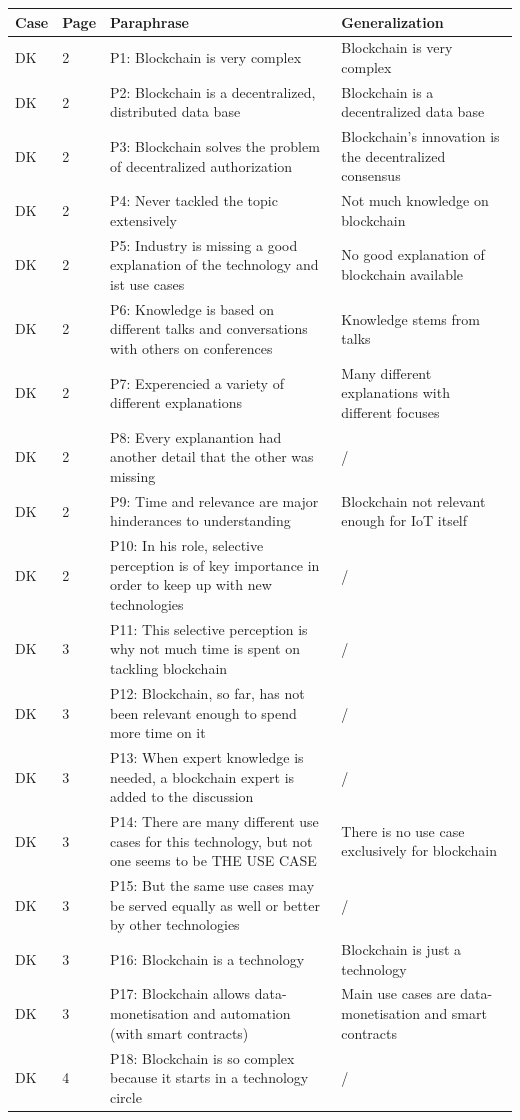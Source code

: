 \label{Anhangteil:DK}
\begin{table}[H]
    \centering
    \begin{tabularx}{\textwidth}{ll|X|p{4cm}}
     Case & Page & Paraphrase & Generalization  \\ \hline
    DK & 2 & P1: Blockchain is very complex & Blockchain is very complex  \\
	DK & 2 & P2: Blockchain is a decentralized, distributed data base & Blockchain is a decentralized data base \\
	DK & 2 & P3: Blockchain solves the problem of decentralized authorization & Blockchain's innovation is the decentralized consensus  \\
	DK & 2 & P4: Never tackled the topic extensively & Not much knowledge on blockchain  \\ 
	DK & 2 & P5: Industry is missing a good explanation of the technology and ist use cases & No good explanation of blockchain available  \\
	DK & 2 & P6: Knowledge is based on different talks and conversations with others on conferences & Knowledge stems from talks  \\
	DK & 2 & P7: Experencied a variety of different explanations & Many different explanations with different focuses   \\
	DK & 2 & P8: Every explanantion had another detail that the other was missing & /  \\
	DK & 2 & P9: Time and relevance are major hinderances to understanding & Blockchain not relevant enough for IoT itself  \\
	DK & 2 & P10: In his role, selective perception is of key importance in order to keep up with new technologies & /  \\
	DK & 3 & P11: This selective perception is why not much time is spent on tackling blockchain & /  \\
	DK & 3 & P12: Blockchain, so far, has not been relevant enough to spend more time on it & /  \\
	DK & 3 & P13: When expert knowledge is needed, a blockchain expert is added to the discussion & /  \\
	DK & 3 & P14: There are many different use cases for this technology, but not one seems to be THE USE CASE & There is no use case exclusively for blockchain  \\
	DK & 3 & P15: But the same use cases may be served equally as well or better by other technologies & /   \\
	DK & 3 & P16: Blockchain is a technology & Blockchain is just a technology \\
	DK & 3 & P17: Blockchain allows data-monetisation and automation (with smart contracts) & Main use cases are data-monetisation and smart contracts \\
	DK & 4 & P18: Blockchain is so complex because it starts in a technology circle & / \\

    \end{tabularx}
\end{table}

